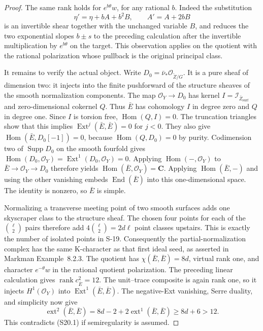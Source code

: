 \documentclass[11pt,a4paper]{article}
\theoremstyle{definition}
\begin{document}
\begin{proof}
The same rank holds for $e^{b\theta}w$, for any rational $b$.
Indeed the substitution
\[
 \eta' =\eta+bA+b^2B,\qquad A'=A+2bB
\]
is an invertible shear together with the unchanged variable
$B$, and reduces the two exponential slopes $b\pm s$ to
the preceding calculation after the invertible multiplication
by $e^{b\theta}$ on the target. This observation applies on
the quotient with the rational polarization whose pullback
is the original principal class.

It remains to verify the actual object. Write
$D_0=\bar\nu_*\mathcal O_{\widetilde Z/G}$.
It is a pure sheaf of dimension two: it injects into the
finite pushforward of the structure sheaves of the smooth
normalization components. The map $\mathcal O_Y\to D_0$
has kernel $I=\mathcal I_{\bar Z_{\mathrm{surf}}}$ and
zero-dimensional cokernel $Q$. Thus $\bar E$ has cohomology
$I$ in degree zero and $Q$ in degree one.
Since $I$ is torsion free,
$\operatorname{Hom}(Q,I)=0$. The truncation triangles show
that this implies
$\operatorname{Ext}^{j}(\bar E,\bar E)=0$ for $j<0$.
They also give
$\operatorname{Hom}(\bar E,D_0[-1])=0$, because
$\operatorname{Hom}(Q,D_0)=0$ by purity.
Codimension two of $\operatorname{Supp}D_0$ on the smooth
fourfold gives
$\operatorname{Hom}(D_0,\mathcal O_Y)
=\operatorname{Ext}^1(D_0,\mathcal O_Y)=0$.
Applying $\operatorname{Hom}(-,\mathcal O_Y)$ to
$\bar E\to\mathcal O_Y\to D_0$ therefore yields
$\operatorname{Hom}(\bar E,\mathcal O_Y)=\mathbf C$.
Applying $\operatorname{Hom}(\bar E,-)$ and using the other
vanishing embeds $\operatorname{End}(\bar E)$ into this
one-dimensional space. The identity is nonzero, so
$\bar E$ is simple.

Normalizing a transverse meeting point of two smooth
surfaces adds one skyscraper class to the structure sheaf.
The chosen four points for each of the $\binom\ell2$ pairs
therefore add $4\binom\ell2=2d\ell$ point classes upstairs.
This is exactly the number of isolated points in S-19.
Consequently the partial-normalization complex has the same
K-character as that first ideal seed, as asserted in
Markman Example~8.2.3. The quotient has
$\chi(\bar E,\bar E)=8d$, virtual rank one, and character
$e^{-\theta}w$ in the rational quotient polarization.
The preceding linear calculation gives
$\operatorname{rank}c_{\bar E}^2=12$.
The unit--trace composite is again rank one, so it injects
$H^1(\mathcal O_Y)$ into
$\operatorname{Ext}^1(\bar E,\bar E)$.
The negative-Ext vanishing, Serre duality, and simplicity
now give
\[
 \operatorname{ext}^2(\bar E,\bar E)
 =8d-2+2\operatorname{ext}^1(\bar E,\bar E)
 \ge8d+6>12.
\]
This contradicts (S20.1) if semiregularity is assumed.


\end{proof}
\end{document}
